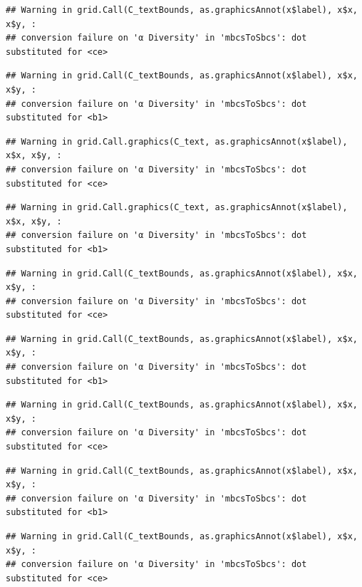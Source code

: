 \documentclass[
]{article}
\begin{document}
\begin{verbatim}
## Warning in grid.Call(C_textBounds, as.graphicsAnnot(x$label), x$x, x$y, :
## conversion failure on 'α Diversity' in 'mbcsToSbcs': dot substituted for <ce>
\end{verbatim}

\begin{verbatim}
## Warning in grid.Call(C_textBounds, as.graphicsAnnot(x$label), x$x, x$y, :
## conversion failure on 'α Diversity' in 'mbcsToSbcs': dot substituted for <b1>
\end{verbatim}

\begin{verbatim}
## Warning in grid.Call.graphics(C_text, as.graphicsAnnot(x$label), x$x, x$y, :
## conversion failure on 'α Diversity' in 'mbcsToSbcs': dot substituted for <ce>
\end{verbatim}

\begin{verbatim}
## Warning in grid.Call.graphics(C_text, as.graphicsAnnot(x$label), x$x, x$y, :
## conversion failure on 'α Diversity' in 'mbcsToSbcs': dot substituted for <b1>
\end{verbatim}

\begin{verbatim}
## Warning in grid.Call(C_textBounds, as.graphicsAnnot(x$label), x$x, x$y, :
## conversion failure on 'α Diversity' in 'mbcsToSbcs': dot substituted for <ce>
\end{verbatim}

\begin{verbatim}
## Warning in grid.Call(C_textBounds, as.graphicsAnnot(x$label), x$x, x$y, :
## conversion failure on 'α Diversity' in 'mbcsToSbcs': dot substituted for <b1>
\end{verbatim}

\begin{verbatim}
## Warning in grid.Call(C_textBounds, as.graphicsAnnot(x$label), x$x, x$y, :
## conversion failure on 'α Diversity' in 'mbcsToSbcs': dot substituted for <ce>
\end{verbatim}

\begin{verbatim}
## Warning in grid.Call(C_textBounds, as.graphicsAnnot(x$label), x$x, x$y, :
## conversion failure on 'α Diversity' in 'mbcsToSbcs': dot substituted for <b1>
\end{verbatim}

\begin{verbatim}
## Warning in grid.Call(C_textBounds, as.graphicsAnnot(x$label), x$x, x$y, :
## conversion failure on 'α Diversity' in 'mbcsToSbcs': dot substituted for <ce>
\end{verbatim}
\end{document}
